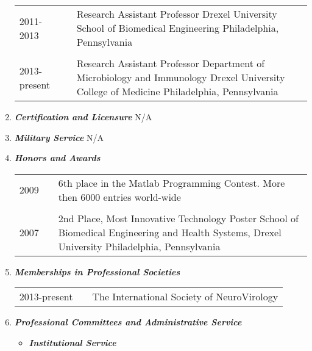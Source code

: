 \documentclass[a4paper,11pt]{article}
\begin{document}
\begin{enumerate}
\begin{longtable}{p{}p{}p{}}
  \\
  2011-2013 & & Research Assistant Professor \newline Drexel University \newline School of Biomedical Engineering \newline Philadelphia, Pennsylvania\\
  \\
  2013-present & & Research Assistant Professor \newline Department of Microbiology and Immunology \newline Drexel University College of Medicine \newline Philadelphia, Pennsylvania\\
 \end{longtable}
\pagestyle{otherpages}
 \item {\LARGE \itshape \bfseries Certification and Licensure} \newline
 N/A
 \item {\LARGE \itshape \bfseries Military Service} \newline
 N/A
 \item {\LARGE \itshape \bfseries Honors and Awards}
 \begin{longtable}{p{}p{}p{}}
  2009 & & 6th place in the Matlab Programming Contest. \newline More then 6000 entries world-wide\\
  \\
  2007 & & 2nd Place, Most Innovative Technology Poster \newline School of Biomedical Engineering and Health Systems, Drexel University \newline Philadelphia, Pennsylvania\\
  \end{longtable}
 \item {\LARGE \itshape \bfseries Memberships in Professional Societies}
  \begin{longtable}{p{}p{}p{}}
  2013-present & & The International Society of NeuroVirology\\
  \end{longtable}
 \item {\LARGE \itshape \bfseries Professional Committees and Administrative Service}
 \begin{itemize}
  \item[] {\Large \bfseries \itshape Institutional Service}
  \begin{longtable}{p{}p{}p{}}

\end{longtable}
\end{itemize}
\end{enumerate}
\end{document}
